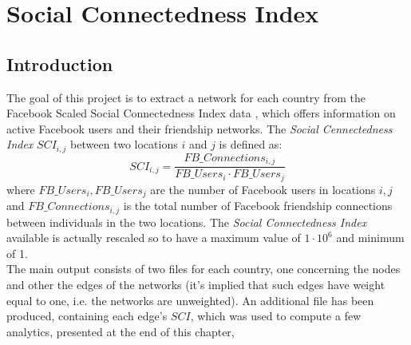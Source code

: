 \chapter{Social Connectedness Index}



 

\section{Introduction}

The goal of this project is to extract a network for each country from the Facebook Scaled Social Connectedness Index data \cite{facebook_sci}, which offers information on active Facebook users and their friendship networks. The \textit{Social Cennectedness Index} $SCI_{i,j}$ between two locations $i$ and $j$ is defined as:
$$SCI_{i,j}=\frac{FB\_Connections_{i,j}}{FB\_Users_i\cdot FB\_Users_j}$$
where $FB\_Users_i,FB\_Users_j$ are the number of Facebook users in locations $i,j$ and $FB\_Connections_{i,j}$ is the total number of Facebook friendship connections between individuals in the two locations. The \textit{Social Connectedness Index} available is actually rescaled so to have a maximum value of $1\cdot10^6$ and minimum of 1. \\
The main output consists of two files for each country, one concerning the nodes and other the edges of the networks (it's implied that such edges have weight equal to one, i.e. the networks are unweighted). An additional file has been produced, containing each edge's $SCI$, which was used to compute a few analytics, presented at the end of this chapter,

